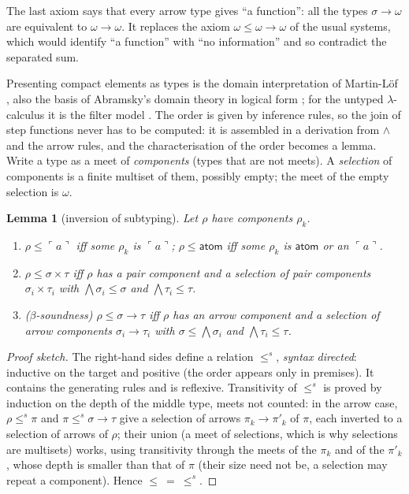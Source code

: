 \documentclass[11pt]{amsart}
\newtheorem{lemma}[theorem]{Lemma}
\theoremstyle{definition}
\theoremstyle{remark}
\newcommand{\at}[1]{\ulcorner #1\urcorner}
\newcommand{\Atom}{\mathsf{atom}}
\begin{document}
The last axiom says that every arrow type gives ``a function'': all the types
$\sigma\to\omega$ are equivalent to $\omega\to\omega$. It replaces the axiom
$\omega\le\omega\to\omega$ of the usual systems, which would identify ``a
function'' with ``no information'' and so contradict the separated sum.

Presenting compact elements as types is the domain interpretation of
Martin-L\"of \cite{ML83}, also the basis of Abramsky's domain theory in
logical form \cite{Abr91}; for the untyped $\lambda$-calculus it is the
filter model \cite{BCD83}. The order is given by inference rules, so the join
of step functions never has to be computed: it is assembled in a derivation
from $\wedge$ and the arrow rules, and the characterisation of the order
becomes a lemma. Write a type as a meet of \emph{components} (types that are
not meets). A \emph{selection} of components is a finite multiset of them,
possibly empty; the meet of the empty selection is $\omega$.

\begin{lemma}[inversion of subtyping]\label{lem:inv}
Let $\rho$ have components $\rho_k$.
\begin{enumerate}
\item $\rho\le\at a$ iff some $\rho_k$ is $\at a$; $\rho\le\Atom$ iff some
$\rho_k$ is $\Atom$ or an $\at a$.
\item $\rho\le\sigma\times\tau$ iff $\rho$ has a pair component and a
selection of pair components $\sigma_i\times\tau_i$ with
$\bigwedge\sigma_i\le\sigma$ and $\bigwedge\tau_i\le\tau$.
\item ($\beta$-soundness) $\rho\le\sigma\to\tau$ iff $\rho$ has an arrow
component and a selection of arrow components $\sigma_i\to\tau_i$ with
$\sigma\le\bigwedge\sigma_i$ and $\bigwedge\tau_i\le\tau$.
\end{enumerate}
\end{lemma}

\begin{proof}[Proof sketch]
The right-hand sides define a relation $\le^{s}$, \emph{syntax directed}:
inductive on the target and positive (the order appears only in premises).
It contains the generating rules and is reflexive. Transitivity of $\le^s$ is
proved by induction on the depth of the middle type, meets not counted: in
the arrow case, $\rho\le^s\pi$ and $\pi\le^s\sigma\to\tau$ give a selection
of arrows $\pi_k\to\pi'_k$ of $\pi$, each inverted to a selection of arrows of
$\rho$; their union (a meet of selections, which is why selections are
multisets) works, using transitivity through the meets of the $\pi_k$ and of
the $\pi'_k$, whose depth is smaller than that of $\pi$ (their size need not
be, a selection may repeat a component). Hence $\le\ =\ \le^s$.
\end{proof}
\end{document}
